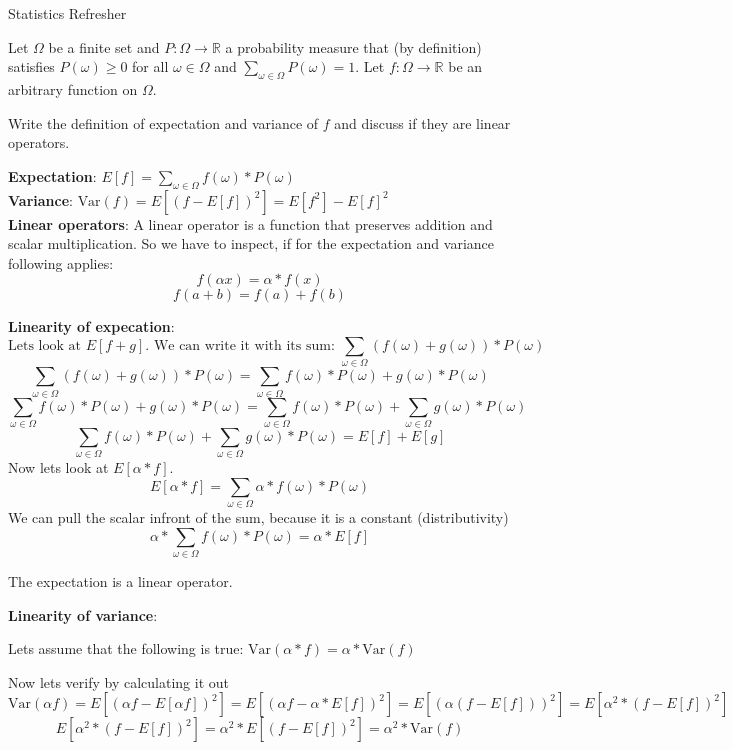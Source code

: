\documentclass[
	english,
        solution=true
	]{tudaexercise}
\newcommand{\R}{\mathbb{R}}
\begin{document}
\begin{task}[points=15]{Statistics Refresher}

\begin{subtask}[points=4,title=Expectation and Variance]


Let $\Omega$ be a finite set and $P:\Omega\rightarrow\R$ a probability measure
that (by definition) satisfies $P(\omega)\geq0$ for all $\omega\in\Omega$ and
$\sum_{\omega\in\Omega}P(\omega)=1$.  Let $f:\Omega\rightarrow\R$ be an
arbitrary function on $\Omega$.

Write the definition of expectation and variance of $f$ and discuss if they are linear operators.


\begin{solution}

\textbf{Expectation}: $E[f]=\sum_{\omega\in \Omega} f(\omega) * P(\omega)$ \\ 
\textbf{Variance}: $\text{Var}(f)=E[(f-E[f])^2]=E[f^2]-E[f]^2$\\

\textbf{Linear operators}: A linear operator is a function that preserves addition and scalar multiplication. So we have to inspect, if for the expectation and variance following applies: 
\[f(\alpha x)=\alpha * f(x)\]
\[f(a+b)=f(a)+f(b)\]

\textbf{Linearity of expecation}:
\[\text{Lets look at } E[f+g]. \text{ We can write it with its sum: } \sum_{\omega \in \Omega} (f(\omega)+g(\omega))*P(\omega)\]
\[\sum_{\omega \in \Omega} (f(\omega)+g(\omega))*P(\omega)=\sum_{\omega \in \Omega} f(\omega)*P(\omega)+g(\omega)*P(\omega)\]
\[\sum_{\omega \in \Omega} f(\omega)*P(\omega)+g(\omega)*P(\omega)=\sum_{\omega \in \Omega} f(\omega)*P(\omega) + \sum_{\omega \in \Omega} g(\omega)*P(\omega)\]
\[\sum_{\omega \in \Omega} f(\omega)*P(\omega) + \sum_{\omega \in \Omega} g(\omega)*P(\omega) = E[f]+E[g]\]
Now lets look at $E[\alpha * f]$. 
\[E[\alpha * f]=\sum_{\omega \in \Omega} \alpha*f(\omega)*P(\omega)\]
We can pull the scalar infront of the sum, because it is a constant (distributivity)
\[\alpha * \sum_{\omega \in \Omega} f(\omega)*P(\omega)=\alpha * E[f]\]

The expectation is a linear operator.

\textbf{Linearity of variance}:

Lets assume that the following is true: $\text{Var}(\alpha * f)=\alpha * \text{Var}(f)$

Now lets verify by calculating it out
\[\text{Var}(\alpha f)=E[(\alpha f - E[\alpha f])^2]= E[(\alpha f - \alpha * E[f])^2]=E[(\alpha(f - E[f]))^2]=E[\alpha^2 *(f-E[f])^2]
\]
\[E[\alpha^2 *(f-E[f])^2]=\alpha^2 * E[(f-E[f])^2]=\alpha^2*\text{Var}(f)\]


\end{solution}
\end{subtask}
\end{task}
\end{document}
